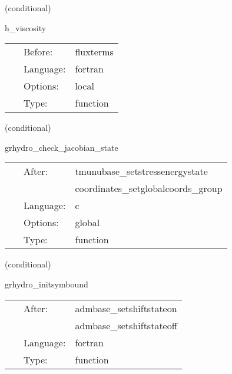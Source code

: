    (conditional) 

\hspace{5mm} h\_viscosity 

\hspace{5mm}{\it compute local temporaries for h viscosity } 


\hspace{5mm}

 \begin{tabular*}{160mm}{cll} 
~ & Before:  & fluxterms \\ 
~ & Language:  & fortran \\ 
~ & Options:  & local \\ 
~ & Type:  & function \\ 
\end{tabular*} 


\vspace{5mm}

   (conditional) 

\hspace{5mm} grhydro\_check\_jacobian\_state 

\hspace{5mm}{\it test state of jacobians } 


\hspace{5mm}

 \begin{tabular*}{160mm}{cll} 
~ & After:  & tmunubase\_setstressenergystate \\ 
~& ~ &coordinates\_setglobalcoords\_group\\ 
~ & Language:  & c \\ 
~ & Options:  & global \\ 
~ & Type:  & function \\ 
\end{tabular*} 


\vspace{5mm}

   (conditional) 

\hspace{5mm} grhydro\_initsymbound 

\hspace{5mm}{\it schedule symmetries and check shift state } 


\hspace{5mm}

 \begin{tabular*}{160mm}{cll} 
~ & After:  & admbase\_setshiftstateon \\ 
~& ~ &admbase\_setshiftstateoff\\ 
~ & Language:  & fortran \\ 
~ & Type:  & function \\ 
\end{tabular*} 


